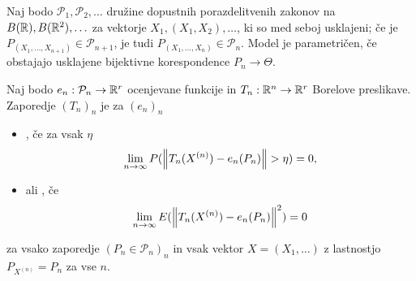 Naj bodo $\mathcal{P}_1, \mathcal{P}_2, \ldots$ družine dopustnih
porazdelitvenih zakonov na $B(\mathbb{R}), B(\mathbb{R}^2), \ldots$ za vektorje $X_1, (X_1,
X_2), \ldots$, ki so med seboj usklajeni; če je $P_{(X_1, \ldots, X_{n+1})} \in
\mathcal{P}_{n+1}$, je tudi $P_{(X_1, \ldots, X_n)} \in \mathcal{P}_n$.
Model je parametričen, če obstajajo usklajene bijektivne korespondence $P_n \to
\Theta$.

\begin{definicija}
  Naj bodo $e_n: \mathcal{P}_n \to \mathbb{R}^r$ ocenjevane funkcije in $T_n: \mathbb{R}^n \to
  \mathbb{R}^r$ Borelove preslikave.
  Zaporedje $(T_n)_n$ je za $(e_n)_n$
  \begin{itemize}
  \item {}, če za vsak $\eta$
	\[
	  \lim_{n \to \infty} P(\left\lVert T_n(X^{(n)}) - e_n(P_n)\right\rVert > \eta) = 0,
	\]
  \item {} ali , če
	\[
	  \lim_{n \to \infty} E(\left\lVert T_n(X^{(n)}) - e_n(P_n)\right\rVert^2) = 0
	\]
  \end{itemize}
  za vsako zaporedje $(P_n \in \mathcal{P}_n)_n$ in vsak vektor $X = (X_1,
  \ldots)$ z lastnostjo $P_{X^{(n)}} = P_n$ za vse $n$.
\end{definicija}

